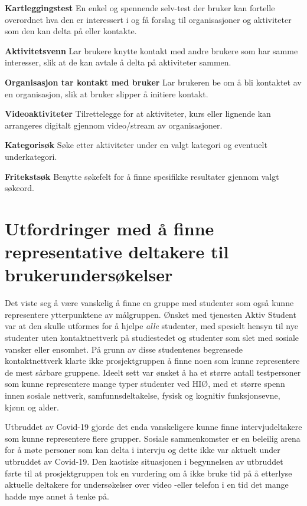 \begin{compactitem}
\item[{\bf Kartleggingstest}] En enkel og spennende selv-test der bruker kan fortelle overordnet hva den er interessert i og få forslag til organisasjoner og aktiviteter som den kan delta på eller kontakte.
\item[{\bf Aktivitetsvenn}] Lar brukere knytte kontakt med andre brukere som har samme interesser, slik at de kan avtale å delta på aktiviteter sammen.
\item[{\bf Organisasjon tar kontakt med bruker}] Lar brukeren be om å bli kontaktet av en organisasjon, slik at bruker slipper å initiere kontakt.
\item[{\bf Videoaktiviteter}] Tilrettelegge for at aktiviteter, kurs eller lignende kan arrangeres digitalt gjennom video/stream av organisasjoner.
\item[{\bf Kategorisøk}] Søke etter aktiviteter under en valgt kategori og eventuelt underkategori.
\item[{\bf Fritekstsøk}] Benytte søkefelt for å finne spesifikke resultater gjennom valgt søkeord.
\end{compactitem}

\section{Utfordringer med å finne representative deltakere til brukerundersøkelser}
Det viste seg å være vanskelig å finne en gruppe med studenter som også kunne representere ytterpunktene av målgruppen. Ønsket med tjenesten Aktiv Student var at den skulle utformes for å hjelpe {\em  alle} studenter, med spesielt hensyn til nye studenter uten kontaktnettverk på studiestedet og studenter som slet med sosiale vansker eller ensomhet. På grunn av disse studentenes begrensede kontaktnettverk klarte ikke prosjektgruppen å finne noen som kunne representere de mest sårbare gruppene. Ideelt sett var ønsket å ha et større antall testpersoner som kunne representere mange typer studenter ved HIØ, med et større spenn innen sosiale nettverk, samfunnsdeltakelse, fysisk og kognitiv funksjonsevne, kjønn og alder.

Utbruddet av Covid-19 gjorde det enda vanskeligere kunne finne intervjudeltakere som kunne representere flere grupper. Sosiale sammenkomster er en beleilig arena for å møte personer som kan delta i intervju og dette ikke var aktuelt under utbruddet av Covid-19. Den kaotiske situasjonen i begynnelsen av utbruddet førte til at prosjektgruppen tok en vurdering om å ikke bruke tid på å etterlyse aktuelle deltakere for undersøkelser over video -eller telefon i en tid det mange hadde mye annet å tenke på. 

